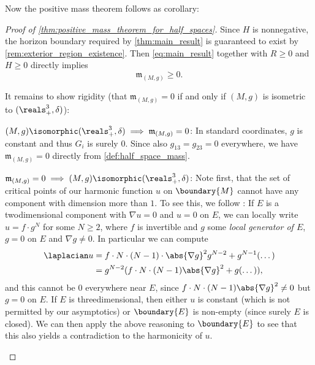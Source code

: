 \documentclass[titlepage,numbers=noenddot,oneside,%
cleardoublepage=empty,paper=a4,fontsize=11pt,%
english,%
]{scrartcl}
\newcommand{\mass}[2]{\mathfrak{m}_{(#1,#2)}} %
\begin{document}
Now the positive mass theorem follows as corollary:
\begin{proof}[Proof of \cref{thm:positive_mass_theorem_for_half_spaces}]
    Since \( H \) is nonnegative, the horizon boundary required by \cref{thm:main_result} is guaranteed to exist by \cref{rem:exterior_region_existence}. Then \cref{eq:main_result} together with \( R\geq 0 \) and \( H\geq 0 \) directly implies
    \begin{equation*}
        \mass{M}{g}\geq 0.
    \end{equation*}

    It remains to show rigidity (\ie that \( \mass{M}{g}=0 \) if and only if \( (M,g)\) is isometric to \( (\reals^3_{+},\delta) \)):
    \begin{proofdescription}
        \item{\( (M,g)\isomorphic(\reals^3_{+},\delta) \implies \mass{M}{g}=0   \):} In standard coordinates, \( g \) is constant and thus \( G_i \) is surely \( 0 \). Since also \( g_{13}=g_{23}=0 \) everywhere, we have \( \mass{M}{g}=0 \) directly from \cref{def:half_space_mass}. 
        \item{\(  \mass{M}{g}=0 \implies (M,g)\isomorphic(\reals^3_{+},\delta) \):} 
        Note first, that the set of critical points of our harmonic function \( u \) on \( \boundary{M} \) cannot have any component with dimension more than \( 1  \). To see this, we follow \cite[Section 4 Lemma 1]{goldsteinGradientFlowHarmonic2009}: If \( E \) is a twodimensional component with \( \nabla u=0 \) and \( u=0 \) on \( E \), we can locally write \( u=f\cdot g^N \) for some \( N\geq 2 \), where \( f \) is invertible and \( g \) some \emph{local generator of \( E \)}, \ie \( g=0 \) on \( E \) and \( \nabla g\neq 0 \). In particular we can compute
        \begin{equation*}
            \begin{aligned}[t]
                \laplacian u&=f\cdot N\cdot (N-1)\cdot \abs{\nabla g}^2 g^{N-2}+g^{N-1}(\dotsc)\\
                &=g^{N-2}(f\cdot N\cdot (N-1)\abs{\nabla g}^2+g(\dotsc)),
            \end{aligned}
        \end{equation*}
        and this cannot be \( 0 \) everywhere near \( E \), since \( f\cdot N\cdot (N-1)\abs{\nabla g}^2\neq 0 \) but \( g=0 \) on \( E \). If \( E \) is threedimensional, then either \( u \) is constant (which is not permitted by our asymptotics) or \( \boundary{E} \) is non-empty (since surely \( E \) is closed). We can then apply the above reasoning to \( \boundary{E} \) to see that this also yields a contradiction to the harmonicity of \( u \).


\end{proofdescription}
\end{proof}
\end{document}
